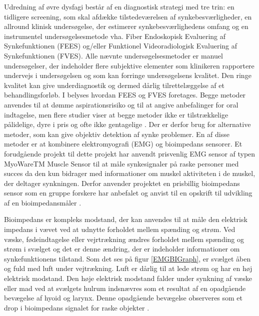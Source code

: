 Udredning af øvre dysfagi består af en diagnostisk strategi med tre trin: en tidligere screening, som skal afdække tilstedeværelsen af synkebesværligheder, en allround klinisk undersøgelse, der estimerer synkebesværlighedens omfang og en instrumentel undersøgelsesmetode vha. Fiber Endoskopisk Evaluering af Synkefunktionen (FEES) og/eller Funktionel Videoradiologisk Evaluering af Synkefunktionen (FVES). Alle nævnte undersøgelsesmetoder er manuel undersøgelser, der indeholder flere subjektive elementer som klinikeren rapportere undervejs i undersøgelsen og som kan forringe undersøgelsens kvalitet. Den ringe kvalitet kan give underdiagnostik og dermed dårlig tilrettelæggelse af et behandlingsforløb. I  belyses hvordan FEES og FVES foretages. Begge metoder anvendes til at dømme aspirationsrisiko og til at angive anbefalinger for oral indtagelse, men flere studier viser at begge metoder ikke er tilstrækkelige pålidelige, dyre i pris og ofte ikke gentagelige \cite{Kelly2006} \cite{McCullough2001Inter-Measures} \cite{Schultheiss2014} \cite{Nahrstaedt2012SwallowMeasurements}.  Der er derfor brug for alternative metoder, som kan give objektiv detektion af synke problemer. En af disse metoder er at kombinere elektromyografi (EMG) og bioimpedans sensorer. Et forudgående projekt til dette projekt har anvendt prisvenlig EMG sensor af typen MyoWareTM Muscle Sensor til at måle synkesignaler på raske personer med succes \cite[s. 58]{ChristensenElisabethLundbakStrand2017} da den kun bidrager med informationer om muskel aktiviteten i de muskel, der deltager synkningen. Derfor anvender projektet en prisbillig bioimpedans sensor som en gruppe forskere har anbefalet og anvist til en opskrift til udvikling af en bioimpedansmåler \cite{Aroom2009}.

Bioimpedans er kompleks modstand, der kan anvendes til at måle den elektrisk impedans i vævet ved at udnytte forholdet mellem spænding og strøm. Ved væske, fødeindtagelse eller vejrtrækning ændres forholdet mellem spænding og strøm i svælget og det er denne ændring, der er indeholder informationer om 
synkefunktionens tilstand. Som det ses på figur \ref{EMGBIGraph}, er svælget åben og fuld med luft under vejtrækning. Luft er dårlig til at lede strøm og har en høj elektrisk modstand. Den høje elektrisk modstand falder under synkning af væske eller mad ved at svælgets hulrum indsnævres som et resultat af en opadgående bevægelse af hyoid og larynx. Denne opadgående bevægelse observeres som et drop i bioimpedans signalet for raske objekter \cite{Schultheiss2014}.         



